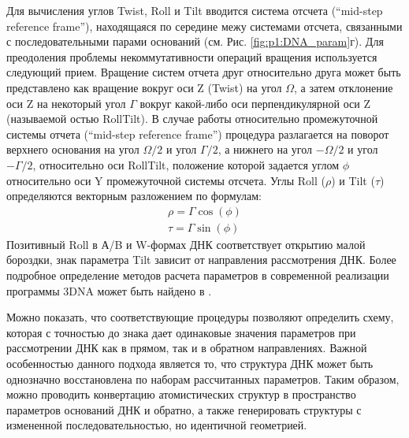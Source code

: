 Для вычисления углов Twist, Roll и Tilt вводится система отсчета (``mid-step reference frame''), находящаяся по середине межу системами отсчета, связанными с последовательными парами оснований (см. Рис. \ref{fig:p1:DNA_param}г). Для преодоления проблемы некоммутативности операций вращения используется следующий прием. Вращение систем отчета друг относительно друга может быть представлено как вращение вокруг оси Z (Twist) на угол $\Omega$, а затем отклонение оси Z на некоторый угол $\Gamma$ вокруг какой-либо оси перпендикулярной оси Z (называемой остью RollTilt). В случае работы относительно промежуточной системы отчета (``mid-step reference frame'') процедура разлагается на поворот верхнего основания на угол $\Omega/2$ и угол $\Gamma/2$, а нижнего на угол $-\Omega/2$ и угол $-\Gamma/2$, относительно оси RollTilt, положение которой задается углом $\phi$ относительно оси Y промежуточной системы отсчета. Углы Roll ($\rho$) и Tilt ($\tau$) определяются векторным разложением по формулам:
\begin{eqnarray}
 \rho=\Gamma \cos(\phi)\\
 \tau=\Gamma \sin(\phi)
\end{eqnarray}
Позитивный Roll в А/B и W-формах ДНК соответствует открытию малой бороздки, знак параметра Tilt зависит от направления рассмотрения ДНК. Более подробное определение методов расчета параметров в современной реализации программы 3DNA может быть найдено в \cite{lu_structure_1997}.

Можно показать, что соответствующие процедуры позволяют определить схему, которая с точностью до знака дает одинаковые значения параметров при рассмотрении ДНК как в прямом, так и в обратном направлениях.
Важной особенностью данного подхода является то, что структура ДНК может быть однозначно восстановлена по наборам рассчитанных параметров. Таким образом, можно проводить конвертацию атомистических структур в пространство параметров оснований ДНК и обратно, а также генерировать структуры с измененной последовательностью, но идентичной геометрией. 


